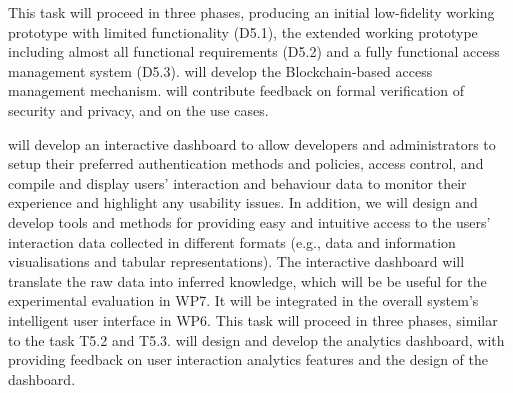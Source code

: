 \begin{Workpackage}{\thewpno}
\begin{Task}
This task will proceed in three phases, producing an initial low-fidelity working prototype with limited functionality (D5.1), the extended working prototype including almost all functional requirements (D5.2) and a fully functional access management system (D5.3). \COGNIshort{} will develop the Blockchain-based access management mechanism. \USTANshort{} will contribute feedback on formal verification of security and privacy, and \SOPRAshort{} on the use cases.
\end{Task}


\begin{Task}
\TaskResults{%
\ref{del:auth1},
\ref{del:auth2},
\ref{del:auth3}
}
\TaskHeader{}

\theTask{} will develop an interactive dashboard to allow developers and administrators to setup their preferred authentication methods and policies, access control, and compile and display users’ interaction and behaviour data to monitor their experience and highlight any usability issues. In addition, we will design and develop tools and methods for providing easy and intuitive access to the users’ interaction data collected in different formats (e.g., data and information visualisations and tabular representations). %
The interactive dashboard will translate the raw data into inferred knowledge, which will be be useful for the experimental evaluation in WP7. It will be integrated in the overall system's intelligent user interface in WP6. This task will proceed in three phases, similar to the task T5.2 and T5.3.
\COGNIshort{} will design and develop the analytics dashboard, with \FRQshort{} providing feedback on user interaction analytics features and the design of the dashboard.
\end{Task}


\end{Workpackage}
